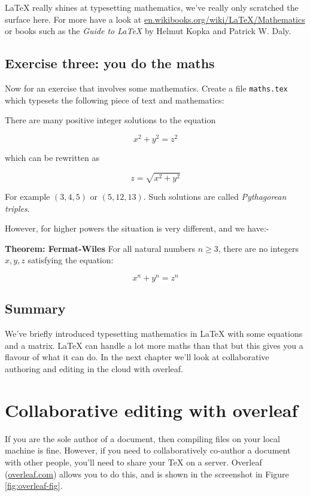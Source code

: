 \documentclass[
]{book}
\begin{document}
LaTeX really shines at typesetting mathematics, we've really only scratched the surface here. For more have a look at
\href{https://en.wikibooks.org/wiki/LaTeX/Mathematics}{en.wikibooks.org/wiki/LaTeX/Mathematics} or books such as the \emph{Guide to LaTeX} by Helmut Kopka and Patrick W. Daly. \citep{kopka}

\hypertarget{ex3}{%
\section{Exercise three: you do the maths}\label{ex3}}

Now for an exercise that involves some mathematics. Create a file \texttt{maths.tex} which typesets the following piece of text and mathematics:

There are many positive integer solutions to the equation

\[ x^2 + y^2 =  z^2 \]

which can be rewritten as

\[ z = \sqrt{x^2 + y^2} \]

For example \((3,4, 5)\) or \((5,12,13)\). Such solutions are called \emph{Pythagorean triples}.

However, for higher powers the situation is very different, and we have:-

\textbf{Theorem: Fermat-Wiles}
For all natural numbers \(n ≥ 3\), there are no integers \(x,y,z\) satisfying the equation:

\[ x^n + y^n = z^n \]

\hypertarget{mathconc}{%
\section{Summary}\label{mathconc}}

We've briefly introduced typesetting mathematics in LaTeX with some equations and a matrix. LaTeX can handle a lot more maths than that but this gives you a flavour of what it can do. In the next chapter we'll look at collaborative authoring and editing in the cloud with overleaf.

\hypertarget{overleaf}{%
\chapter{Collaborative editing with overleaf}\label{overleaf}}

If you are the sole author of a document, then compiling files on your local machine is fine. However, if you need to collaboratively co-author a document with other people, you'll need to share your TeX on a server. Overleaf (\href{https://www.overleaf.com/}{overleaf.com}) allows you to do this, and is shown in the screenshot in Figure \ref{fig:overleaf-fig}.
\end{document}
